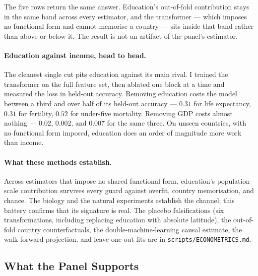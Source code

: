 \documentclass[12pt,letterpaper]{article}
\begin{document}
The five rows return the same answer. Education's out-of-fold
contribution stays in the same band across every estimator, and the
transformer --- which imposes no functional form and cannot memorise a
country --- sits inside that band rather than above or below it. The
result is not an artifact of the panel's estimator.

\paragraph{Education against income, head to head.} The cleanest single
cut pits education against its main rival. I trained the transformer on
the full feature set, then ablated one block at a time and measured the
loss in held-out accuracy. Removing education costs the model between a
third and over half of its held-out accuracy --- $0.31$ for life
expectancy, $0.31$ for fertility, $0.52$ for under-five mortality.
Removing GDP costs almost nothing --- $0.02$, $0.002$, and $0.007$ for
the same three. On unseen countries, with no functional form imposed,
education does an order of magnitude more work than income.

\paragraph{What these methods establish.} Across estimators that impose
no shared functional form, education's population-scale contribution
survives every guard against overfit, country memorisation, and chance.
The biology and the natural experiments establish the channel; this
battery confirms that its signature is real. The placebo falsifications
(six transformations, including replacing education with absolute
latitude), the out-of-fold country counterfactuals, the
double-machine-learning causal estimate, the walk-forward projection,
and leave-one-out fits are in \texttt{scripts/ECONOMETRICS.md}.

\subsection{What the Panel Supports}\label{what-the-panel-supports}
\end{document}
